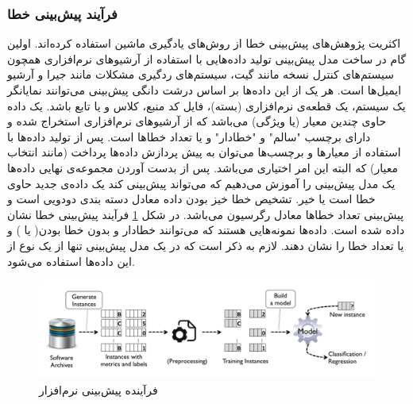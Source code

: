 \subsubsection{فرآیند پیش‌بینی خطا}
اکثریت پژوهش‌های پیش‌بینی خطا از روش‌های یادگیری ماشین  استفاده کرده‌اند. اولین گام در ساخت مدل پیش‌بینی تولید داده‌هایی با استفاده از آرشیو‌های نرم‌افزاری همچون سیستم‌های کنترل نسخه مانند گیت، سیستم‌های ردگیری مشکلات  مانند جیرا و آرشیو ایمیل‌ها است. هر یک از این داده‌ها بر اساس درشت دانگی پیش‌بینی می‌توانند نمایانگر یک سیستم، یک قطعه‌ی نرم‌افزاری (بسته)، فایل کد منبع، کلاس و یا تابع باشد. یک داده حاوی چندین معیار (یا ویژگی) می‌باشد که از آرشیو‌های نرم‌افزاری استخراج شده و دارای برچسب "سالم" و "خطادار"  و یا تعداد خطاها است. پس از تولید داده‌ها با استفاده از معیارها و برچسب‌ها می‌توان به پیش پردازش داده‌ها پرداخت (مانند انتخاب معیار) که البته این امر اختیاری می‌باشد. پس از بدست آوردن مجموعه‌ی نهایی داده‌ها یک مدل پیش‌بینی را آموزش می‌دهیم که می‌تواند پیش‌بینی کند یک داده‌ی جدید حاوی خطا است یا خیر. تشخیص خطا خیز بودن داده معادل دسته بندی دودویی است و پیش‌بینی تعداد خطاها معادل رگرسیون می‌باشد. در شکل \ref{fig:prediction-process} فرآیند پیش‌بینی خطا نشان داده شده است. داده‌ها نمونه‌هایی هستند که می‌توانند خطادار  و بدون  خطا  بودن(    یا    ) و یا تعداد خطا را نشان دهند. لازم به ذکر است که در یک مدل پیش‌بینی تنها از یک نوع از این داده‌ها استفاده می‌شود.

\begin{figure}[H]
	\centering
	\includegraphics[width=1.0\textwidth]{images/prediction-process.PNG}
	 \caption{فرآینده پیش‌بینی نرم‌افزار \cite{nam2014survey}}
	\label{fig:prediction-process}
\end{figure}